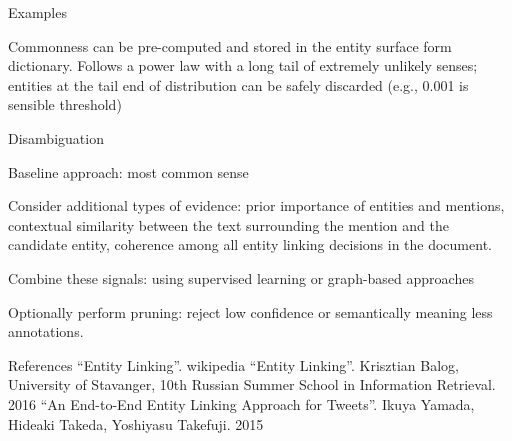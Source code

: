 Examples



Commonness can be pre-computed and stored in the entity surface form dictionary. Follows a power law with a long tail of extremely unlikely senses; entities at the tail end of distribution can be safely discarded (e.g., 0.001 is sensible threshold)



Disambiguation


Baseline approach: most common sense

Consider additional types of evidence: prior importance of entities and mentions, contextual similarity between the text surrounding the mention and the candidate entity, coherence among all entity linking decisions in the document.

Combine these signals: using supervised learning or graph-based approaches

Optionally perform pruning: reject low confidence or semantically meaning less annotations.

References
“Entity Linking”. wikipedia
“Entity Linking”. Krisztian Balog, University of Stavanger, 10th Russian Summer School in Information Retrieval. 2016
“An End-to-End Entity Linking Approach for Tweets”. Ikuya Yamada, Hideaki Takeda, Yoshiyasu Takefuji. 2015
